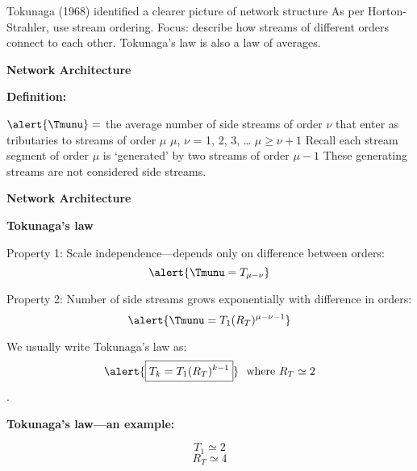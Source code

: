 \begin{frame}[label=]
\begin{frame}[label=]
\begin{frame}[label=]
\begin{frame}[label=]
\begin{frame}[label=]
\begin{frame}[label=]
\begin{frame}[label=]
\begin{frame}[label=]
\begin{frame}[label=]
\begin{frame}[label=]
\begin{frame}[label=]
\begin{frame}[label=]
\begin{frame}[label=]
\begin{frame}[label=]
\begin{columns}[b]
\begin{frame}[label=]
\begin{frame}[label=]
\begin{frame}[label=]
\begin{frame}[label=]
\begin{frame}[label=]
\begin{frame}[label=]
\begin{frame}[label=]
\begin{frame}[label=]
\begin{frame}[label=]
\begin{frame}[label=]
\begin{frame}[label=]
\begin{frame}[label=]
\begin{frame}[label=]
\begin{frame}[label=]
     Tokunaga (1968) identified a clearer picture of network structure\cite{tokunaga1966a,tokunaga1978a,tokunaga1984a}
     As per Horton-Strahler, use \alert{stream ordering}.
     \alert{Focus:} describe how streams of different orders connect to each other.
     Tokunaga's law is also a law of averages.
    
  




\begin{frame}[label=]
  \textbf{Network Architecture}

  \textbf{Definition:}
    
     
      $ \alert{\Tmunu} = $
      the average number of \alert{side streams} of \alert{order $\nu$}
      that enter as tributaries to 
      streams of \alert{order $\mu$}
     $\mu$, $\nu$ = 1, 2, 3, \ldots
     $\mu \ge \nu+1$
     Recall each stream segment of order $\mu$ is `generated' by
      two streams of order $\mu-1$
    These generating streams are not considered side streams.
    
  


\begin{frame}[label=]
  \textbf{Network Architecture}

  \textbf{Tokunaga's law}
    
    
      Property 1: Scale independence---depends only on difference between orders:
      {
        $$ \alert{ \Tmunu  = T_{\mu-\nu}} $$
      }
    
      Property 2: Number of side streams grows exponentially with difference in orders:
      {
        $$ \alert{\Tmunu= T_1 (R_T)^{\mu-\nu-1}} $$
      }
    
      We usually write Tokunaga's law as:
      $$ \alert{\boxed{T_k = T_1 (R_T)^{k-1}}} \mbox{\ \ where $R_T \simeq 2$} $$
      .
    
  


\begin{frame}[label=]
  \textbf{Tokunaga's law---an example:}

      
    $$ T_1 \simeq 2 $$
    $$ R_T \simeq 4 $$
    

\end{frame}
\end{frame}
\end{frame}
\end{frame}
\end{frame}
\end{frame}
\end{frame}
\end{frame}
\end{frame}
\end{frame}
\end{frame}
\end{frame}
\end{frame}
\end{frame}
\end{frame}
\end{frame}
\end{frame}
\end{columns}
\end{frame}
\end{frame}
\end{frame}
\end{frame}
\end{frame}
\end{frame}
\end{frame}
\end{frame}
\end{frame}
\end{frame}
\end{frame}
\end{frame}
\end{frame}
\end{frame}
